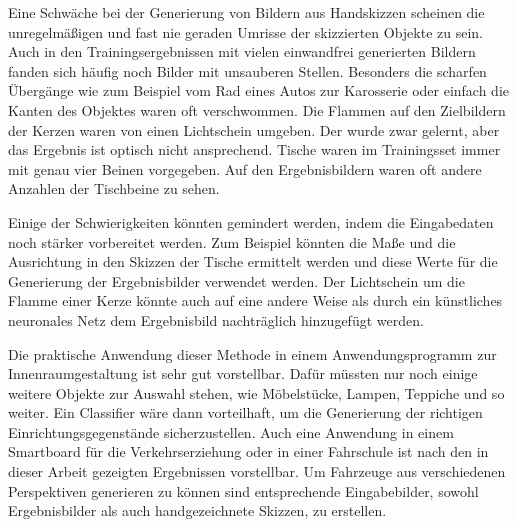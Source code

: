 Eine Schwäche bei der Generierung von Bildern aus Handskizzen scheinen die unregelmäßigen und fast nie geraden Umrisse der skizzierten Objekte zu sein. Auch in den Trainingsergebnissen mit vielen einwandfrei generierten Bildern fanden sich häufig noch Bilder mit unsauberen Stellen. Besonders die scharfen Übergänge wie zum Beispiel vom Rad eines Autos zur Karosserie oder einfach die Kanten des Objektes waren oft verschwommen. Die Flammen auf den Zielbildern der Kerzen waren von einen Lichtschein umgeben. Der wurde zwar gelernt, aber das Ergebnis ist optisch nicht ansprechend. Tische waren im Trainingsset immer mit genau vier Beinen vorgegeben. Auf den Ergebnisbildern waren oft andere Anzahlen der Tischbeine zu sehen.

Einige der Schwierigkeiten könnten gemindert werden, indem die Eingabedaten noch stärker vorbereitet werden. Zum Beispiel könnten die Maße und die Ausrichtung in den Skizzen der Tische ermittelt werden und diese Werte für die Generierung der Ergebnisbilder verwendet werden. Der Lichtschein um die Flamme einer Kerze könnte auch auf eine andere Weise als durch ein künstliches neuronales Netz dem Ergebnisbild nachträglich hinzugefügt werden.

Die praktische Anwendung dieser Methode in einem Anwendungsprogramm zur Innenraumgestaltung ist sehr gut vorstellbar. Dafür müssten nur noch einige weitere Objekte zur Auswahl stehen, wie Möbelstücke, Lampen, Teppiche und so weiter. Ein Classifier wäre dann vorteilhaft, um die Generierung der richtigen Einrichtungsgegenstände sicherzustellen. Auch eine Anwendung in einem Smartboard für die Verkehrserziehung oder in einer Fahrschule ist nach den in dieser Arbeit gezeigten Ergebnissen vorstellbar. Um Fahrzeuge aus verschiedenen Perspektiven generieren zu können sind entsprechende Eingabebilder, sowohl Ergebnisbilder als auch handgezeichnete Skizzen, zu erstellen.
